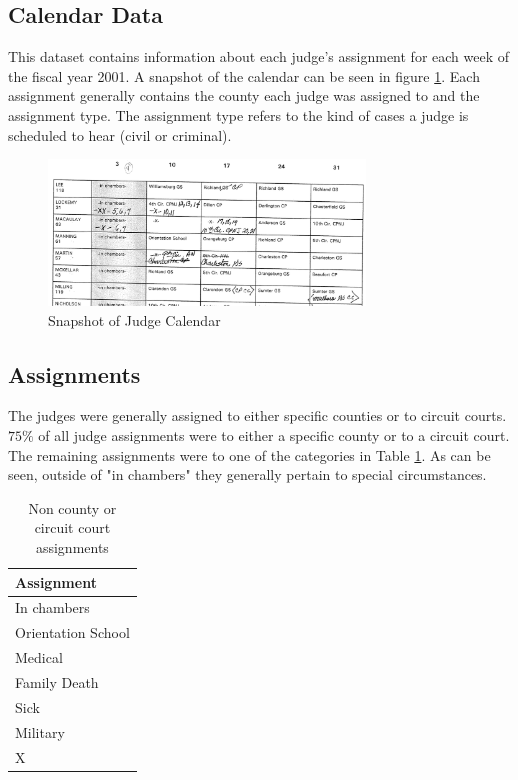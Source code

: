 \documentclass[11pt]{article}
\theoremstyle{ModifiedStyle}
\begin{document}
  \subsection{Calendar Data}
    This dataset contains information about each judge's assignment for each week of the fiscal year 2001. A snapshot of the calendar can be seen in figure \ref{fig-calendar}. Each assignment generally contains the county each judge was assigned to and the assignment type. The assignment type refers to the kind of cases a judge is scheduled to hear (civil or criminal).
    \begin{figure}[h]
        \centering
        \caption{Snapshot of Judge Calendar}
        \label{fig-calendar}
        \includegraphics[width=0.75\textwidth, keepaspectratio=true]{Figures/Fig4.png}
      \end{figure}

    \subsection{Assignments}
      The judges were generally assigned to either specific counties or to circuit courts. $75\%$ of all judge assignments were to either a specific county or to a circuit court. The remaining assignments were to one of the categories in Table \ref{tab-special-assignments}. As can be seen, outside of "in chambers" they generally pertain to special circumstances.

      \begin{table}[H]
        \centering
        \caption{Non county or circuit court assignments}
        \label{tab-special-assignments}
        \begin{tabular}{l}
        \hline
        \textbf{Assignment}                      \\ \hline
        In chambers        \\
        Orientation School \\
        Medical            \\
        Family Death       \\
        Sick              \\
        Military           \\
        X                  \\ \hline
        \end{tabular}
      \end{table}
\end{document}
